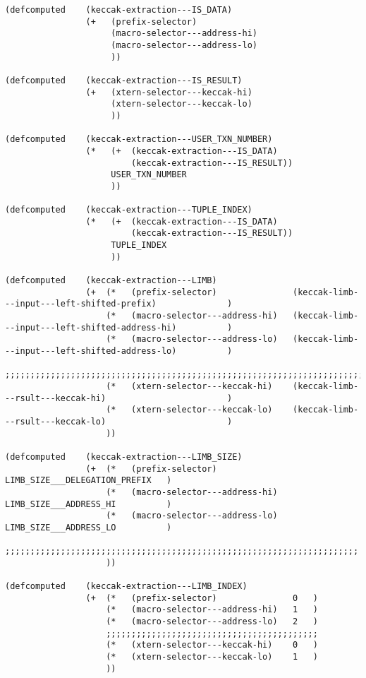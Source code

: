 \documentclass[varwidth=\maxdimen,margin=0.5cm,multi={verbatim}]{standalone}
\begin{document}
\begin{verbatim}
(defcomputed    (keccak-extraction---IS_DATA)
                (+   (prefix-selector)             
                     (macro-selector---address-hi) 
                     (macro-selector---address-lo) 
                     ))

(defcomputed    (keccak-extraction---IS_RESULT)
                (+   (xtern-selector---keccak-hi)  
                     (xtern-selector---keccak-lo)  
                     ))

(defcomputed    (keccak-extraction---USER_TXN_NUMBER)
                (*   (+  (keccak-extraction---IS_DATA)
                         (keccak-extraction---IS_RESULT))
                     USER_TXN_NUMBER
                     ))

(defcomputed    (keccak-extraction---TUPLE_INDEX)
                (*   (+  (keccak-extraction---IS_DATA)
                         (keccak-extraction---IS_RESULT))
                     TUPLE_INDEX
                     ))

(defcomputed    (keccak-extraction---LIMB)
                (+  (*   (prefix-selector)               (keccak-limb---input---left-shifted-prefix)              )
                    (*   (macro-selector---address-hi)   (keccak-limb---input---left-shifted-address-hi)          )
                    (*   (macro-selector---address-lo)   (keccak-limb---input---left-shifted-address-lo)          )
                    ;;;;;;;;;;;;;;;;;;;;;;;;;;;;;;;;;;;;;;;;;;;;;;;;;;;;;;;;;;;;;;;;;;;;;;;;;;;;;;;;;;;;;;;;;;;;;;;
                    (*   (xtern-selector---keccak-hi)    (keccak-limb---rsult---keccak-hi)                        )
                    (*   (xtern-selector---keccak-lo)    (keccak-limb---rsult---keccak-lo)                        )
                    ))

(defcomputed    (keccak-extraction---LIMB_SIZE)
                (+  (*   (prefix-selector)               LIMB_SIZE___DELEGATION_PREFIX   )
                    (*   (macro-selector---address-hi)   LIMB_SIZE___ADDRESS_HI          )
                    (*   (macro-selector---address-lo)   LIMB_SIZE___ADDRESS_LO          )
                    ;;;;;;;;;;;;;;;;;;;;;;;;;;;;;;;;;;;;;;;;;;;;;;;;;;;;;;;;;;;;;;;;;;;;;;
                    ))

(defcomputed    (keccak-extraction---LIMB_INDEX)
                (+  (*   (prefix-selector)               0   )
                    (*   (macro-selector---address-hi)   1   )
                    (*   (macro-selector---address-lo)   2   )
                    ;;;;;;;;;;;;;;;;;;;;;;;;;;;;;;;;;;;;;;;;;;
                    (*   (xtern-selector---keccak-hi)    0   )
                    (*   (xtern-selector---keccak-lo)    1   )
                    ))

\end{verbatim}
\end{document}
